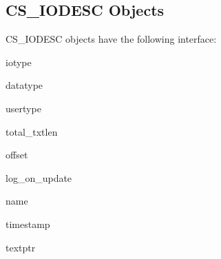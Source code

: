 \subsection{CS_IODESC Objects}

CS_IODESC objects have the following interface:

\begin{memberdesc}[CS_IODESC]{iotype}
\end{memberdesc}

\begin{memberdesc}[CS_IODESC]{datatype}
\end{memberdesc}

\begin{memberdesc}[CS_IODESC]{usertype}
\end{memberdesc}

\begin{memberdesc}[CS_IODESC]{total_txtlen}
\end{memberdesc}

\begin{memberdesc}[CS_IODESC]{offset}
\end{memberdesc}

\begin{memberdesc}[CS_IODESC]{log_on_update}
\end{memberdesc}

\begin{memberdesc}[CS_IODESC]{name}
\end{memberdesc}

\begin{memberdesc}[CS_IODESC]{timestamp}
\end{memberdesc}

\begin{memberdesc}[CS_IODESC]{textptr}
\end{memberdesc}
